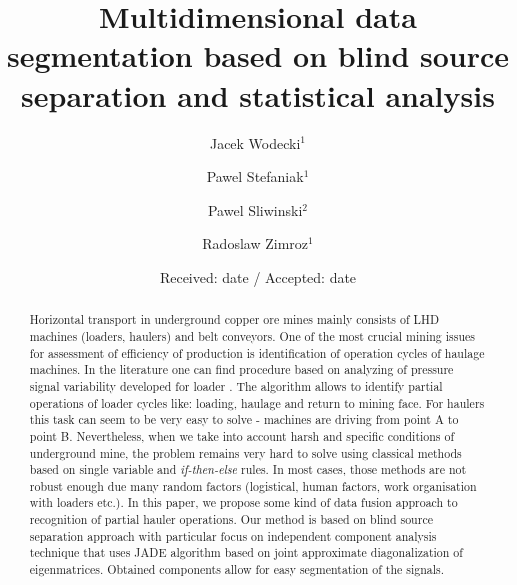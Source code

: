 \title{Multidimensional data segmentation based on blind source separation and statistical analysis %
}
\author{Jacek Wodecki$^1$\and Pawel Stefaniak$^1$\and  Pawel Sliwinski$^2$\and Radoslaw Zimroz$^1$}

\date{Received: date / Accepted: date}
\maketitle
\begin{abstract}
Horizontal transport in underground copper ore mines mainly consists of LHD machines (loaders, haulers) and belt conveyors. One of the most crucial mining issues for assessment of efficiency of production is identification of operation cycles of haulage machines. In the literature one can find procedure based on analyzing of pressure signal variability developed for loader \cite{Polak2006,Stefaniak2015}. The algorithm allows to identify partial operations of loader cycles like: loading, haulage and return to mining face. For haulers this task can seem to be very easy to solve - machines are driving from point A to point B. Nevertheless, when we take into account harsh and specific conditions of underground mine, the problem remains very hard to solve using classical methods based on single variable and \emph{if-then-else} rules. In most cases, those methods are not robust enough due many random factors (logistical, human factors, work organisation  with loaders etc.). In this paper, we propose some kind of data fusion approach to recognition of partial hauler operations. Our method is based on blind source separation approach with particular focus on independent component analysis technique that uses JADE algorithm based on joint approximate diagonalization of eigenmatrices. Obtained components allow for easy segmentation of the signals.
\end{abstract}

